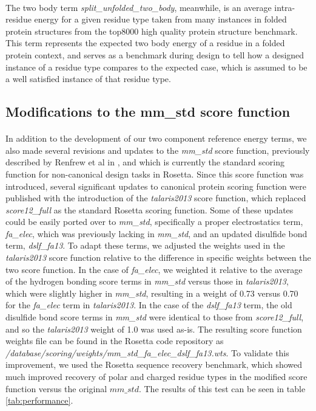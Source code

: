 \paragraph{}
The two body term \textit{split\_unfolded\_two\_body}, meanwhile, is an average intra-residue energy for a given residue type taken from many instances in folded protein structures from the top8000 high quality protein structure benchmark\cite{lovell_structure_2003}.
This term represents the expected two body energy of a residue in a folded protein context, and serves as a benchmark during design to tell how a designed instance of a residue type compares to the expected case, which is assumed to be a well satisfied instance of that residue type.


\subsection{Modifications to the mm\_std score function}
\paragraph{}
In addition to the development of our two component reference energy terms, we also made several revisions and updates to the \textit{mm\_std} score function, previously described by Renfrew et al in \cite{renfrew_incorporation_2012}, and which is currently the standard scoring function for non-canonical design tasks in Rosetta.
Since this score function was introduced, several significant updates to canonical protein scoring function were published with the introduction of the \textit{talaris2013} score function, which replaced \textit{score12\_full} as the standard Rosetta scoring function\cite{leaver-fay_chapter_2013}.
Some of these updates could be easily ported over to \textit{mm\_std}, specifically a proper electrostatics term, \textit{fa\_elec}, which was previously lacking in \textit{mm\_std}, and an updated disulfide bond term, \textit{dslf\_fa13}.
To adapt these terms, we adjusted the weights used in the \textit{talaris2013} score function relative to the difference in specific weights between the two score function.
In the case of \textit{fa\_elec}, we weighted it relative to the average of the hydrogen bonding score terms in \textit{mm\_std} versus those in \textit{talaris2013}, which were slightly higher in \textit{mm\_std}, resulting in a weight of 0.73 versus 0.70 for the \textit{fa\_elec} term in \textit{talaris2013}.
In the case of the \textit{dslf\_fa13} term, the old disulfide bond score terms in \textit{mm\_std} were identical to those from \textit{score12\_full}, and so the \textit{talaris2013} weight of 1.0 was used as-is.
The resulting score function weights file can be found in the Rosetta code repository as \textit{/database/scoring/weights/mm\_std\_fa\_elec\_dslf\_fa13.wts}.
To validate this improvement, we used the Rosetta sequence recovery benchmark, which showed much improved recovery of polar and charged residue types in the modified score function versus the original $mm\_std$.
The results of this test can be seen in table \ref{tab:performance}.


